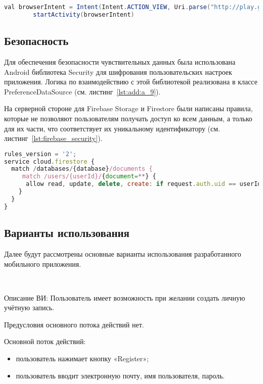 \begin{lstlisting}[language=Java,label={lst:prefs_intent},caption={browserIntent}]
        val browserIntent = Intent(Intent.ACTION_VIEW, Uri.parse("http://play.google.com/store/apps/dev?id=areyanainc"))
        startActivity(browserIntent)
\end{lstlisting}

\subsection{Безопасность}
Для обеспечения безопасности чувствительных данных была использована Android библиотека Security для шифрования пользовательских настроек приложения. Логика по взаимодействию с этой библиотекой реализована в классе PreferenceDataSource (см. листинг~\ref{lst:add:a_9}).

На серверной стороне для Firebase Storage и Firestore были написаны правила, которые не позволяют пользователям получать доступ ко всем данным, а только для их части, что соответствует их уникальному идентификатору (см. листинг~\ref{lst:firebase_security}).

\begin{lstlisting}[language=Javascript,label={lst:firebase_security},caption={Правила Firestore}]
rules_version = '2';
service cloud.firestore {
  match /databases/{database}/documents {
     match /users/{userId}/{document=**} {
      allow read, update, delete, create: if request.auth.uid == userId;
    }
  }
}
\end{lstlisting}


\subsection{Варианты использования}
Далее будут рассмотрены основные варианты использования разработанного мобильного приложения.

~\par
\label{use:reg}
Описание ВИ: Пользователь имеет возможность при желании создать личную учётную запись.
 
Предусловия основного потока действий нет.
 
Основной поток действий:
\begin{itemize}
   \item пользователь нажимает кнопку «Register»;
   \item пользователь вводит электронную почту, имя пользователя, пароль.
\end{itemize}
 

